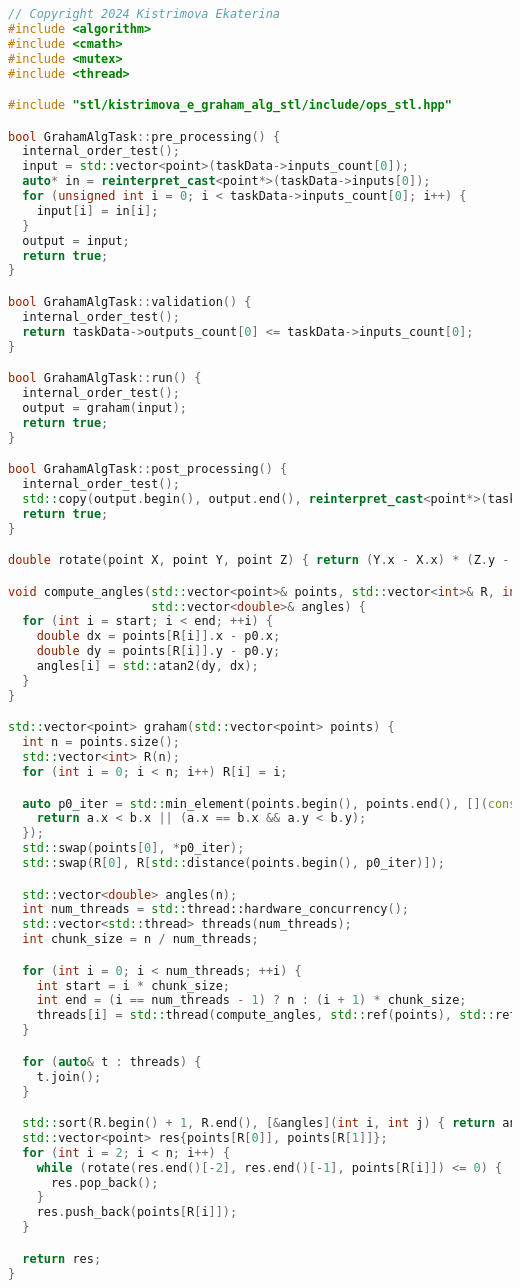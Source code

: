 \documentclass{report}
\begin{document}
\newpage

\begin{lstlisting}[language=C++,caption=STL версия]
// Copyright 2024 Kistrimova Ekaterina
#include <algorithm>
#include <cmath>
#include <mutex>
#include <thread>

#include "stl/kistrimova_e_graham_alg_stl/include/ops_stl.hpp"

bool GrahamAlgTask::pre_processing() {
  internal_order_test();
  input = std::vector<point>(taskData->inputs_count[0]);
  auto* in = reinterpret_cast<point*>(taskData->inputs[0]);
  for (unsigned int i = 0; i < taskData->inputs_count[0]; i++) {
    input[i] = in[i];
  }
  output = input;
  return true;
}

bool GrahamAlgTask::validation() {
  internal_order_test();
  return taskData->outputs_count[0] <= taskData->inputs_count[0];
}

bool GrahamAlgTask::run() {
  internal_order_test();
  output = graham(input);
  return true;
}

bool GrahamAlgTask::post_processing() {
  internal_order_test();
  std::copy(output.begin(), output.end(), reinterpret_cast<point*>(taskData->outputs[0]));
  return true;
}

double rotate(point X, point Y, point Z) { return (Y.x - X.x) * (Z.y - Y.y) - (Y.y - X.y) * (Z.x - Y.x); }

void compute_angles(std::vector<point>& points, std::vector<int>& R, int start, int end, const point& p0,
                    std::vector<double>& angles) {
  for (int i = start; i < end; ++i) {
    double dx = points[R[i]].x - p0.x;
    double dy = points[R[i]].y - p0.y;
    angles[i] = std::atan2(dy, dx);
  }
}

std::vector<point> graham(std::vector<point> points) {
  int n = points.size();
  std::vector<int> R(n);
  for (int i = 0; i < n; i++) R[i] = i;

  auto p0_iter = std::min_element(points.begin(), points.end(), [](const point& a, const point& b) {
    return a.x < b.x || (a.x == b.x && a.y < b.y);
  });
  std::swap(points[0], *p0_iter);
  std::swap(R[0], R[std::distance(points.begin(), p0_iter)]);

  std::vector<double> angles(n);
  int num_threads = std::thread::hardware_concurrency();
  std::vector<std::thread> threads(num_threads);
  int chunk_size = n / num_threads;

  for (int i = 0; i < num_threads; ++i) {
    int start = i * chunk_size;
    int end = (i == num_threads - 1) ? n : (i + 1) * chunk_size;
    threads[i] = std::thread(compute_angles, std::ref(points), std::ref(R), start, end, points[0], std::ref(angles));
  }

  for (auto& t : threads) {
    t.join();
  }

  std::sort(R.begin() + 1, R.end(), [&angles](int i, int j) { return angles[i] < angles[j]; });
  std::vector<point> res{points[R[0]], points[R[1]]};
  for (int i = 2; i < n; i++) {
    while (rotate(res.end()[-2], res.end()[-1], points[R[i]]) <= 0) {
      res.pop_back();
    }
    res.push_back(points[R[i]]);
  }

  return res;
}
\end{lstlisting}
\end{document}
